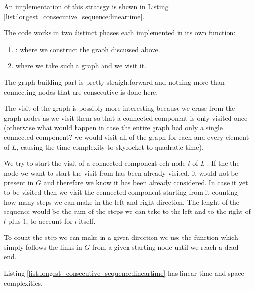 An implementation of this strategy is shown in  Listing \ref{list:longest_consecutive_sequence:lineartime}.



The code works in two distinct phases each implemented in its own function:
\begin{enumerate}
	\item {}: where we construct the graph discussed above.
	\item {} where we take such a graph and we visit it.
\end{enumerate}

The graph building part is pretty straightforward and nothing more than connecting nodes that are consecutive is done here. 

The visit of the graph is possibly more interesting because we erase from the graph nodes  as we visit them so that a connected component is only visited once (otherwise what would happen in case the entire graph had only a single connected component? we would visit all of the graph for each and every element of $L$, causing the time complexity to skyrocket to quadratic time).

We try to start the visit of a connected component ech node $l$ of $L$ . If the the node we want to start the visit from has been already visited, it would not be present in $G$ and therefore we know it has been already considered. 
In case it yet to be visited then we visit the connected component starting from it counting how many steps we can make in the left and right direction. 
The lenght of the sequence would be the sum of the steps we can take to the left and to the right of $l$  plus $1$, to account for $l$ itself.

To count the step we can make in a given direction we use the function  which simply follows the links in $G$ from a given starting node until we reach a dead end.

Listing \ref{list:longest_consecutive_sequence:lineartime} has linear time and space complexities.
